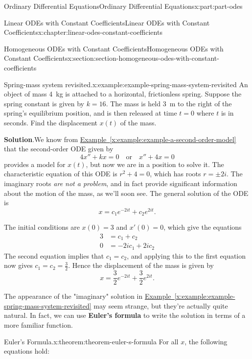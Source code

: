 \documentclass[twoside,10pt,]{book}
\newcommand{\blocktitlefont}{\relax}
\newcommand{\xreffont}{\relax}
\newcommand{\terminology}[1]{\textbf{#1}}
\numberwithin{equation}{part}
\newcommand{\amp}{&}
\begin{document}
\begin{partptx}{Ordinary Differential Equations}{}{Ordinary Differential Equations}{}{}{x:part:part-odes}
\begin{chapterptx}{Linear ODEs with Constant Coefficients}{}{Linear ODEs with Constant Coefficients}{}{}{x:chapter:linear-odes-constant-coefficients}
\begin{sectionptx}{Homogeneous ODEs with Constant Coefficients}{}{Homogeneous ODEs with Constant Coefficients}{}{}{x:section:section-homogeneous-odes-with-constant-coefficients}
\begin{example}{Spring-mass system revisited.}{x:example:example-spring-mass-system-revisited}
An object of mass \SI{4}{\kilo\gram} is attached to a horizontal, frictionless spring. Suppose the spring constant is given by \(k=16\). The mass is held \SI{3}{\meter} to the right of the spring's equilibrium position, and is then released at time \(t=0\) where \(t\) is in seconds. Find the displacement \(x(t)\) of the mass.%
\par\smallskip%
\noindent\textbf{\blocktitlefont Solution}.\hypertarget{g:solution:idp105548815470240}{}\quad{}We know from \hyperref[x:example:example-a-second-order-model]{Example~{\xreffont\ref{x:example:example-a-second-order-model}}} that the second-order ODE given by%
\begin{equation*}
4x'' + kx = 0\quad\text{or}\quad x'' + 4x = 0
\end{equation*}
provides a model for \(x(t)\), but now we are in a position to solve it. The characteristic equation of this ODE is \(r^{2} + 4 = 0\), which has roots \(r=\pm2i\). The imaginary roots \emph{are not a problem}, and in fact provide significant information about the motion of the mass, as we'll soon see. The general solution of the ODE is%
\begin{equation*}
x = c_{1}e^{-2it} + c_{2}e^{2it}.
\end{equation*}
%
\par
The initial conditions are \(x(0) = 3\) and \(x'(0) = 0\), which give the equations%
\begin{align*}
3 \amp = c_{1} + c_{2} \\
0 \amp = -2ic_{1} + 2ic_{2} 
\end{align*}
The second equation implies that \(c_{1} = c_{2}\), and applying this to the first equation now gives \(c_{1} = c_{2} = \frac{3}{2}\). Hence the displacement of the mass is given by%
\begin{equation*}
x = \frac{3}{2}e^{-2it} + \frac{3}{2}e^{2it}.
\end{equation*}
%
\end{example}
The appearance of the "imaginary" solution in \hyperref[x:example:example-spring-mass-system-revisited]{Example~{\xreffont\ref{x:example:example-spring-mass-system-revisited}}} may seem strange, but they're actually quite natural. In fact, we can use \terminology{Euler's formula} to write the solution in terms of a more familiar function.%
\begin{theorem}{Euler's Formula.}{}{x:theorem:theorem-euler-s-formula}%
%
For all \(x\), the following equations hold:%
\begin{align*}

\end{align*}
\end{theorem}
\end{sectionptx}
\end{chapterptx}
\end{partptx}
\end{document}
